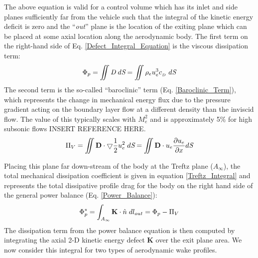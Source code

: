 					The above equation is valid for a control volume which has its inlet and side planes sufficiently far from the vehicle such that the integral of the kinetic energy deficit is zero and the ``\emph{out}'' plane is the location of the exiting plane which can be placed at some axial location along the aerodynamic body.  The first term on the right-hand side of Eq. \ref{Defect_Integral_Equation} is the viscous dissipation term:
					\begin{equation}
						\Phi_p = \iint \emph{D} \hspace{1mm} d\emph{S} = \iint \rho_e u_e^3 c_{_D} \hspace{1mm} d\emph{S}
						\label{Viscous_Dissipation}
					\end{equation}					
  				    The second term is the so-called ``baroclinic'' term (Eq. \ref{Baroclinic_Term}), which represents the change in mechanical energy flux due to the pressure gradient acting on the boundary layer flow at a different density than the inviscid flow.  The value of this typically scales with $M_e^2$ and is approximately 5\% for high subsonic flows INSERT REFERENCE HERE.
  				    \begin{equation}
	  				    \Pi_V = \iint \textbf{D} \cdot \bigtriangledown \frac{1}{2} u_e^2 \hspace{1mm} d \emph{S} =  \iint \textbf{D} \cdot u_e \frac{\partial u_e}{\partial x}d\emph{S}
	  				    \label{Baroclinic_Term}
  				    \end{equation}
					
					Placing this plane far down-stream of the body at the Treftz plane ($A_\infty$), the total mechanical dissipation coefficient is given in equation \ref{Treftz_Integral} and represents the total dissipative profile drag for the body on the right hand side of the general power balance (Eq. \ref{Power_Balance}):
					\begin{equation}
						\Phi_p^* = \int_{A_\infty} \textbf{K} \cdot \hat{n} \hspace{1mm} dl_{out} = \Phi_p - \Pi_V
						\label{Treftz_Integral}
					\end{equation}										
					The dissipation term from the power balance equation is then computed by integrating the axial 2-D kinetic energy defect \textbf{K} over the exit plane area.  We now consider this integral for two types of aerodynamic wake profiles.
					
